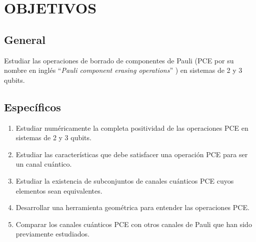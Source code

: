 \chapter{OBJETIVOS}
\section*{General}
Estudiar las operaciones de borrado de componentes de Pauli (PCE por
su nombre en inglés ``\textit{Pauli component erasing operations}'' 
) en sistemas de 2 y 3 qubits.


\section*{Específicos}

\begin{enumerate}
\item Estudiar numéricamente la completa positividad de las operaciones 
PCE en sistemas de 2 y 3 qubits.


\item Estudiar las características que debe satisfacer una operación PCE
para ser un canal cuántico.

\item Estudiar la existencia de subconjuntos de canales cuánticos PCE
cuyos elementos sean equivalentes.

\item Desarrollar una herramienta geométrica para entender las
operaciones PCE.

\item Comparar los canales cuánticos PCE con otros canales de Pauli que han 
sido previamente estudiados.
\end{enumerate}

